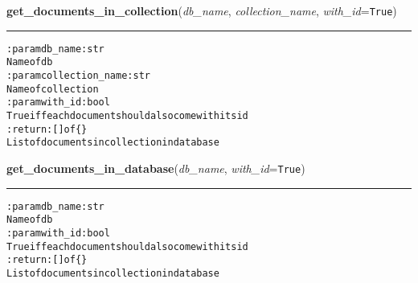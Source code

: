     \label{hal:mongodb:utils:get_documents_in_collection}

    \vspace{0.5ex}

\hspace{.8\funcindent}\begin{boxedminipage}{\funcwidth}

    \raggedright \textbf{get\_documents\_in\_collection}(\textit{db\_name}, \textit{collection\_name}, \textit{with\_id}={\tt True})

    \vspace{-1.5ex}

    \rule{\textwidth}{0.5\fboxrule}
\setlength{\parskip}{2ex}
\begin{alltt}

:param db\_name: str
    Name of db
:param collection\_name: str
    Name of collection
:param with\_id: bool
    True iff each document should also come with its id
:return: [] of \{\}
    List of documents in collection in database
\end{alltt}

\setlength{\parskip}{1ex}
    \end{boxedminipage}

    \label{hal:mongodb:utils:get_documents_in_database}

    \vspace{0.5ex}

\hspace{.8\funcindent}\begin{boxedminipage}{\funcwidth}

    \raggedright \textbf{get\_documents\_in\_database}(\textit{db\_name}, \textit{with\_id}={\tt True})

    \vspace{-1.5ex}

    \rule{\textwidth}{0.5\fboxrule}
\setlength{\parskip}{2ex}
\begin{alltt}

:param db\_name: str
    Name of db
:param with\_id: bool
    True iff each document should also come with its id
:return: [] of \{\}
    List of documents in collection in database
\end{alltt}

\setlength{\parskip}{1ex}
    \end{boxedminipage}

